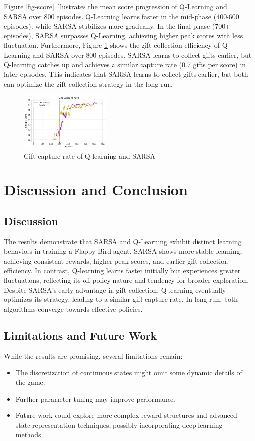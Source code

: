 \documentclass[conference]{IEEEtran}
\begin{document}
Figure \ref{fig-score} illustrates the mean score progression of Q-Learning and SARSA over 800 episodes. Q-Learning learns faster in the mid-phase (400-600 episodes), while SARSA stabilizes more gradually. In the final phase (700+ episodes), SARSA surpasses Q-Learning, achieving higher peak scores with less fluctuation. Furthermore, Figure \ref{fig-gift} shows the gift collection efficiency of Q-Learning and SARSA over 800 episodes. SARSA learns to collect gifts earlier, but Q-learning catches up and achieves a similar capture rate (0.7 gifts per score) in later episodes. This indicates that SARSA learns to collect gifts earlier, but both can optimize the gift collection strategy in the long run.

\begin{figure}[htbp]
\centerline{\includegraphics[width=0.4\textwidth]{gift_rate.png}}
\caption{Gift capture rate of Q-learning and SARSA}
\label{fig-gift}
\end{figure}



\section{Discussion and Conclusion}
\subsection{Discussion}
The results demonstrate that SARSA and Q-Learning exhibit distinct learning behaviors in training a Flappy Bird agent. SARSA shows more stable learning, achieving consistent rewards, higher peak scores, and earlier gift collection efficiency. In contrast, Q-learning learns faster initially but experiences greater fluctuations, reflecting its off-policy nature and tendency for broader exploration. Despite SARSA’s early advantage in gift collection, Q-learning eventually optimizes its strategy, leading to a similar gift capture rate. In long run, both algorithms converge towards effective policies.

\subsection{Limitations and Future Work}
While the results are promising, several limitations remain:
\begin{itemize}
    \item The discretization of continuous states might omit some dynamic details of the game.
    \item Further parameter tuning may improve performance.
    \item Future work could explore more complex reward structures and advanced state representation techniques, possibly incorporating deep learning methods.
\end{itemize}
\end{document}

